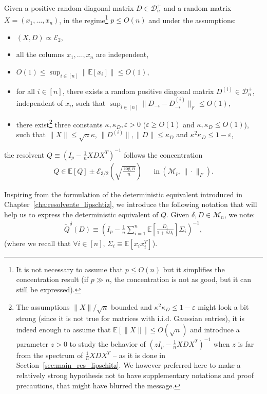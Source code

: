 \documentclass[a4papaer, titlepage]{book}
\begin{document}
\begin{theorem}\label{the:concentration_resolvent_XDX}
   Given a positive random diagonal matrix $D \in \mathcal D_n^+$ and a random matrix $X = (x_1,\ldots, x_n)$, in the regime\footnote{It is not necessary to assume that $p\leq O(n)$ but it simplifies the concentration result (if $p \gg n$, the concentration is not as good, but it can still be expressed).} $p\leq O(n)$ and under the assumptions:
   \begin{itemize}
     \item $(X,D) \propto \mathcal E_2$,
     \item all the columns $x_1,\ldots, x_n$ are independent,
     \item $O(1) \leq \sup_{i\in[n]}\|\mathbb E[x_i] \|\leq O(1)$,
     \item for all $i \in[n]$, there exists a random positive diagonal matrix $D^{(i)} \in \mathcal D_n^+$, independent of $x_i$, such that $ \sup_{i\in[n]}\|D_{-i} - D_{-i}^{(i)}\|_F \leq O(1)$,
     \item there exist\footnote{The assumptions $\|X\|/\sqrt n$ bounded and $\kappa^2 \kappa_D\leq 1-\varepsilon$ might look a bit strong (since it is not true for matrices with i.i.d. Gaussian entries), it is indeed enough to assume that $\mathbb E[\|X\|] \leq O(\sqrt n)$ and introduce a parameter $z>0$ to study the behavior of $(zI_p - \frac{1}{n}XDX^T)^{-1}$ when $z$ is far from the spectrum of $\frac{1}{n}XDX^T$ -- as it is done in Section~\ref{sec:main_res_lipschitz}.
      We however preferred here to make a relatively strong hypothesis not to have supplementary notations and proof precautions, that might have blurred the message.} three constants $\kappa,\kappa_D, \varepsilon>0$ ($\varepsilon \geq O(1)$ and $\kappa,\kappa_D\leq O(1)$), such that $\|X\| \leq \sqrt n\kappa$, $\|D^{(i)}\|,\|D\| \leq \kappa_D$ and $\kappa^2 \kappa_D\leq 1-\varepsilon$,
   \end{itemize}
   the resolvent $Q \equiv (I_p - \frac{1}{n}XDX^T)^{-1}$ follows the concentration
   \begin{align*}
     Q  \in \mathbb E[Q] \pm \mathcal E_{3/2} \left( \sqrt{\frac{\log n }{n}} \right)&
    &\text{in} \ (\mathcal M_{p}, \|\cdot \|_F).
   \end{align*}
\end{theorem}
Inspiring from the formulation of the deterministic equivalent introduced in Chapter~\ref{cha:resolvente_lipschtiz}, we introduce the following notation that will help us to express the deterministic equivalent of $ Q$. Given
  $\delta, D\in \mathcal M_n $, we note:
 \begin{align*}
   \tilde Q^\delta(D) \equiv \left( I_p - \frac{1}{n} \sum_{i=1}^n \mathbb E \left[ \frac{D_i}{1 + \delta D_i} \right] \Sigma_i \right)^{-1},
 \end{align*}
 (where we recall that $\forall i \in [n]$, $\Sigma_i \equiv \mathbb E[x_ix_i^T]$).
\end{document}
